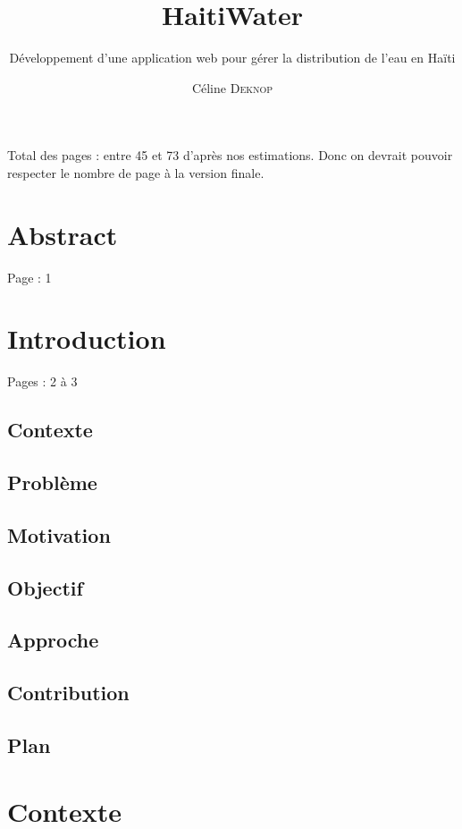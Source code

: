 \documentclass{eplmastersthesis_FR}
\title{HaitiWater}
\subtitle{Développement d'une application web pour gérer la distribution de l'eau en Haïti}
\author{Céline \textsc{Deknop}}
\begin{document}
	\maketitle
	\thispagestyle{empty}

	Total des pages : entre 45 et 73 d'après nos estimations. Donc on devrait pouvoir respecter le nombre de page à la version finale.

	\chapter*{Abstract}


		Page : 1

	\chapter{Introduction}

		Pages : 2 à 3

		\section*{Contexte}

		\section*{Problème}

		\section*{Motivation}

		\section*{Objectif}

		\section*{Approche}

		\section*{Contribution}

		\section*{Plan}

	\chapter{Contexte}
\end{document}
